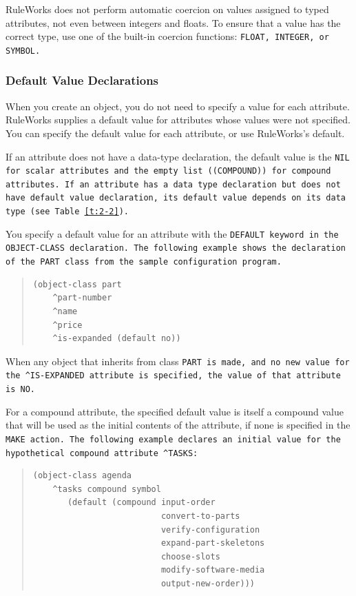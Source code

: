 RuleWorks does not perform automatic coercion on values
assigned to typed attributes, not even between integers and
floats. To ensure that a value has the correct type, use one
of the built-in coercion functions: \tt{FLOAT}, \tt{INTEGER}, or
\tt{SYMBOL}.

\subsubsection{Default Value Declarations}

When you create an object, you do not need to specify a value
for each attribute. RuleWorks supplies a default value for
attributes whose values were not specified. You can specify
the default value for each attribute, or use RuleWorks's
default.

If an attribute does not have a data-type declaration, the default
value is the \tt{NIL} for scalar attributes and the empty list
(\tt{(COMPOUND)}) for compound attributes. If an attribute has a data
type declaration but does not have default value declaration, its
default value depends on its data type (see Table~\ref{t:2-2}).

You specify a default value for an attribute with the \tt{DEFAULT}
keyword in the \tt{OBJECT-CLASS} declaration. The following
example shows the declaration of the \tt{PART} class from the
sample configuration program.

\begin{quote}
\begin{verbatim}
(object-class part
    ^part-number
    ^name
    ^price 
    ^is-expanded (default no))
\end{verbatim}
\end{quote}

When any object that inherits from class \tt{PART} is made, and no
new value for the \verb|^IS-EXPANDED| attribute is specified, the
value of that attribute is \tt{NO}.

For a compound attribute, the specified default value is
itself a compound value that will be used as the initial
contents of the attribute, if none is specified in the \tt{MAKE}
action. The following example declares an initial value for
the hypothetical compound attribute \verb|^TASKS|:

\begin{quote}
\begin{verbatim}
(object-class agenda
    ^tasks compound symbol
       (default (compound input-order
                          convert-to-parts
                          verify-configuration
                          expand-part-skeletons
                          choose-slots
                          modify-software-media
                          output-new-order)))
\end{verbatim}
\end{quote}

